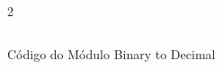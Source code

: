 \begin{figure}[H]
    \centering   
    \begin{tcolorbox}  
        \begin{multicols}{2} 
        \fontsize{9pt}{9pt}\selectfont\inputminted[obeytabs=true,tabsize=4,xleftmargin=20pt,linenos,breaklines]{VHDL}{VHDL/files/bin2dec.vhd}    
        \end{multicols}
    \end{tcolorbox}   
    \caption{Código do Módulo Binary to Decimal}
\end{figure}